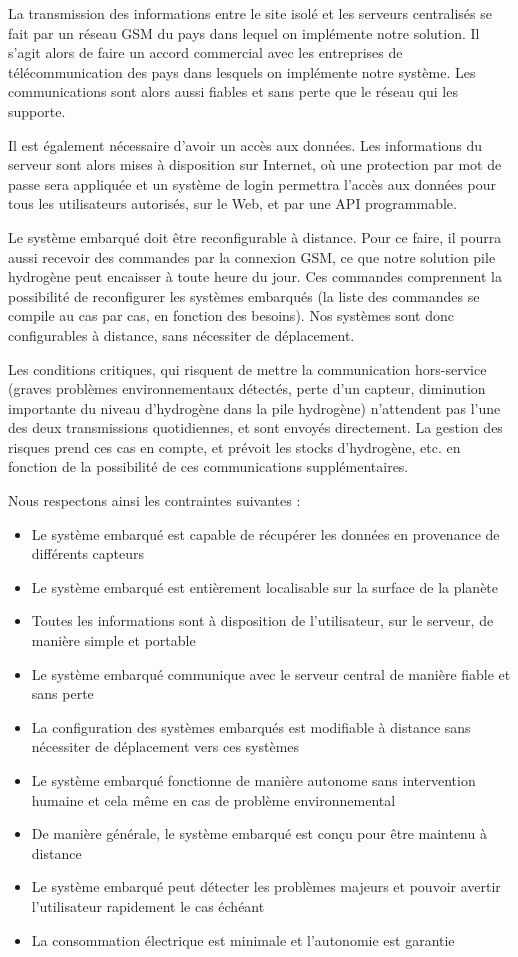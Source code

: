 La transmission des informations entre le site isolé et les serveurs centralisés se fait par un réseau GSM du pays dans lequel on implémente notre solution. Il s’agit alors de faire un accord commercial avec les entreprises de télécommunication des pays dans lesquels on implémente notre système. Les communications sont alors aussi fiables et sans perte que le réseau qui les supporte.

Il est également nécessaire d’avoir un accès aux données. Les informations du serveur sont alors mises à disposition sur Internet, où une protection par mot de passe sera appliquée et un système de login permettra l’accès aux données pour tous les utilisateurs autorisés, sur le Web, et par une API programmable.

Le système embarqué doit être reconfigurable à distance. Pour ce faire, il pourra aussi recevoir des commandes par la connexion GSM, ce que notre solution pile hydrogène peut encaisser à toute heure du jour. Ces commandes comprennent la possibilité de reconfigurer les systèmes embarqués (la liste des commandes se compile au cas par cas, en fonction des besoins). Nos systèmes sont donc configurables à distance, sans nécessiter de déplacement.

Les conditions critiques, qui risquent de mettre la communication hors-service (graves problèmes environnementaux détectés, perte d’un capteur, diminution importante du niveau d’hydrogène dans la pile hydrogène) n’attendent pas l’une des deux transmissions quotidiennes, et sont envoyés directement. La gestion des risques prend ces cas en compte, et prévoit les stocks d’hydrogène, etc. en fonction de la possibilité de ces communications supplémentaires.

Nous respectons ainsi les contraintes suivantes :

\begin{itemize}
\item Le système embarqué est capable de récupérer les données en provenance de différents capteurs
\item Le système embarqué est entièrement localisable sur la surface de la planète
\item Toutes les informations sont à disposition de l’utilisateur, sur le serveur, de manière simple et portable
\item Le système embarqué communique avec le serveur central de manière fiable et sans perte
\item La configuration des systèmes embarqués est modifiable à distance sans nécessiter de déplacement vers ces systèmes
\item Le système embarqué fonctionne de manière autonome sans intervention humaine et cela même en cas de problème environnemental
\item De manière générale, le système embarqué est conçu pour être maintenu à distance
\item Le système embarqué peut détecter les problèmes majeurs et pouvoir avertir l’utilisateur rapidement le cas échéant
\item La consommation électrique est minimale et l’autonomie est garantie
\end{itemize}

